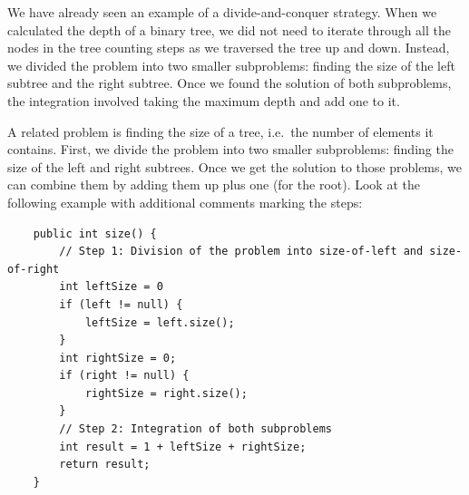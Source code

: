 We have already seen an example of a divide-and-conquer strategy. When
we calculated the depth of a binary tree, we did not need to iterate through
all the nodes in the tree counting steps as we traversed the tree up
and down. Instead, we divided the problem into two smaller
subproblems: finding the size of the left subtree and the right
subtree. Once we found the solution of both subproblems, the
integration involved taking the maximum depth and add one to it. 

A related problem is finding the size of a tree, i.e.~the number of
elements it contains. First, we divide the problem into two smaller
subproblems: finding the size of the left and right subtrees. Once we
get the solution to those problems, we can combine them by adding them
up plus one (for the root). Look at the following example with
additional comments marking the steps: 

\begin{verbatim}
    public int size() {
        // Step 1: Division of the problem into size-of-left and size-of-right
        int leftSize = 0
        if (left != null) {
            leftSize = left.size();
        }
        int rightSize = 0;
        if (right != null) {
            rightSize = right.size();
        }
        // Step 2: Integration of both subproblems
        int result = 1 + leftSize + rightSize;
        return result;
    }
\end{verbatim}


